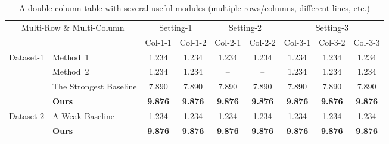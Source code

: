 \begin{table*}[t]
  \centering
  \caption{A double-column table with several useful modules (multiple rows/columns, different lines, etc.)}
    \begin{tabular}{cl|cc|cc|ccc}
      \toprule
      \multicolumn{2}{c|}{\multirow{2}{*}{Multi-Row \& Multi-Column}} & \multicolumn{2}{c|}{Setting-1} & \multicolumn{2}{c|}{Setting-2} &  \multicolumn{3}{c}{Setting-3} \\
      & & Col-1-1 & Col-1-2 & Col-2-1 & Col-2-2 & Col-3-1 & Col-3-2 & Col-3-3 \\
      \midrule
      \multirow{4.5}{*}{Dataset-1} & Method~1 & 1.234 & 1.234 & 1.234 & 1.234 & 1.234 & 1.234 & 1.234 \\
      & Method~2 & 1.234 & 1.234 & -- & -- & 1.234 & 1.234 & 1.234 \\
      & The Strongest Baseline & 7.890 & 7.890 & 7.890 & 7.890 & 7.890 & 7.890 & 7.890 \\
      \cmidrule(lr){2-9}
      & \textbf{Ours} & \textbf{9.876} & \textbf{9.876} & \textbf{9.876} & \textbf{9.876} & \textbf{9.876} & \textbf{9.876} & \textbf{9.876} \\
      \cmidrule{1-9}
      \multirow{2.5}{*}{Dataset-2} & A Weak Baseline & 1.234 & 1.234 & 1.234 & 1.234 & 1.234 & 1.234 & 1.234 \\
      \cmidrule(lr){2-9}
      & \textbf{Ours} & \textbf{9.876} & \textbf{9.876} & \textbf{9.876} & \textbf{9.876} & \textbf{9.876} & \textbf{9.876} & \textbf{9.876} \\
      \bottomrule
    \end{tabular}
  \label{tab:double}
\end{table*}
